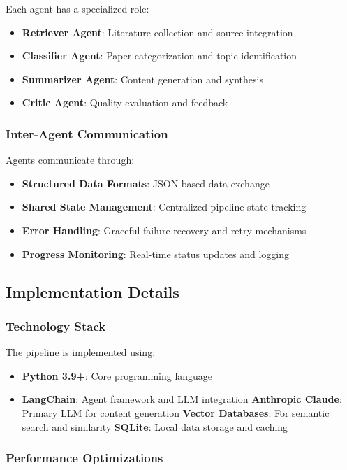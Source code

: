 Each agent has a specialized role:
\begin{itemize}
    \item \textbf{Retriever Agent}: Literature collection and source integration
    \item \textbf{Classifier Agent}: Paper categorization and topic identification
    \item \textbf{Summarizer Agent}: Content generation and synthesis
    \item \textbf{Critic Agent}: Quality evaluation and feedback
\end{itemize}

\subsubsection{Inter-Agent Communication}

Agents communicate through:
\begin{itemize}
    \item \textbf{Structured Data Formats}: JSON-based data exchange
    \item \textbf{Shared State Management}: Centralized pipeline state tracking
    \item \textbf{Error Handling}: Graceful failure recovery and retry mechanisms
    \item \textbf{Progress Monitoring}: Real-time status updates and logging
\end{itemize}

\subsection{Implementation Details}

\subsubsection{Technology Stack}

The pipeline is implemented using:
\begin{itemize}
    \item \textbf{Python 3.9+}: Core programming language
    \item \textbf{LangChain}: Agent framework and LLM integration
    \textbf{Anthropic Claude}: Primary LLM for content generation
    \textbf{Vector Databases}: For semantic search and similarity
    \textbf{SQLite}: Local data storage and caching
\end{itemize}

\subsubsection{Performance Optimizations}

